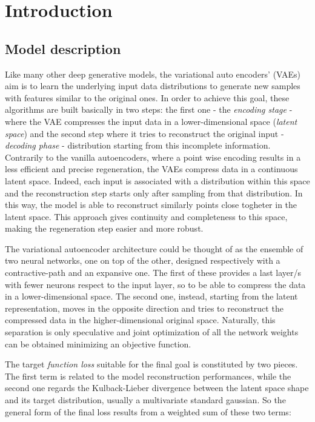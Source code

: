 %
\section{Introduction}\label{sec:introduction}
%
\subsection{Model description}
\label{subsec:model_description}
Like many other deep generative models, the variational auto encoders' (VAEs) aim is to learn the underlying input data distributions to generate new samples with features similar to the original ones. In order to achieve this goal, these algorithms are built basically in two steps: the first one - the \textit{encoding stage} - where the VAE compresses the input data in a lower-dimensional space (\textit{latent space}) and the second step where it tries to reconstruct the original input - \textit{decoding phase} - distribution starting from this incomplete information. \\Contrarily to the vanilla autoencoders, where a point wise encoding results in a less efficient and precise regeneration, the VAEs compress data in a continuous latent space. Indeed, each input is associated with a distribution within this space and the reconstruction step starts only after sampling from that distribution. In this way, the model is able to reconstruct similarly points close togheter in the latent space. This approach gives continuity and completeness to this space, making the regeneration step easier and more robust.

The variational autoencoder architecture could be thought of as the ensemble of two neural networks, one on top of the other, designed respectively with a contractive-path and an expansive one. The first of these provides a last layer/s with fewer neurons respect to the input layer, so to be able to compress the data in a lower-dimensional space. The second one, instead, starting from the latent representation, moves in the opposite direction and tries to reconstruct the compressed data in the higher-dimensional original space. Naturally, this separation is only speculative and joint optimization of all the network weights can be obtained minimizing an objective function.


The target \textit{function loss} suitable for the final goal is constituted by two pieces. The first term is related to the model reconstruction performances, while the second one regards the Kulback-Lieber divergence between the latent space shape and its target distribution, usually a multivariate standard gaussian. So the general form of the final loss results from a weighted sum of these two terms:


